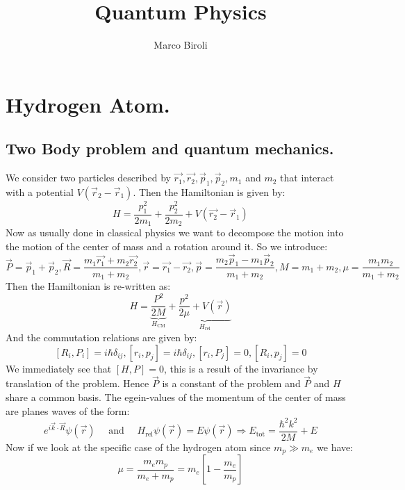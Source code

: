 \documentclass[10pt,a4paper]{book}
\author{Marco Biroli}
\title{Quantum Physics}
\begin{document}
\maketitle
\tableofcontents

\chapter{Hydrogen Atom.}
\section{Two Body problem and quantum mechanics.}
We consider two particles described by $\vec{r_1}, \vec{r_2}, \vec{p}_1, \vec{p}_2, m_1$ and $m_2$ that interact with a potential $V(\vec{r}_2 - \vec{r}_1)$. Then the Hamiltonian is given by:
\[
H = \frac{p_1^2}{2 m_1} + \frac{p_2^2}{2 m_2} + V(\vec{r_2} - \vec{r}_1)
\]
Now as usually done in classical physics we want to decompose the motion into the motion of the center of mass and a rotation around it. So we introduce:
\[
\vec{P} = \vec{p}_1 + \vec{p}_2,  \vec{R} = \frac{m_1 \vec{r_1} + m_2 \vec{r_2}}{m_1 + m_2}, \vec{r} = \vec{r_1} - \vec{r_2}, \vec{p} = \frac{m_2 \vec{p}_1 - m_1 \vec{p}_2}{m_1 + m_2}, M = m_1 + m_2, \mu = \frac{m_1 m_2}{m_1 + m_2}
\]
Then the Hamiltonian is re-written as:
\[
H = \underbrace{\frac{P^2}{2M}}_{H_{\text{CM}}} + \underbrace{\frac{p^2}{2\mu} + V(\vec{r})}_{H_\text{rel}}
\]
And the commutation relations are given by:
\[
[R_i, P_i] = i \hbar \delta_{ij}, [r_i, p_j] = i\hbar \delta_{ij}, [r_i, P_j] = 0, [R_i, p_j] = 0
\]
We immediately see that $[H, P] = 0$, this is a result of the invariance by translation of the problem. Hence $\vec{P}$ is a constant of the problem and $\vec{P}$ and $H$ share a common basis. The egein-values of the momentum of the center of mass are planes waves of the form:
\[
e^{i \vec{k} \cdot \vec{R}} \psi(\vec{r}) \quad \text{ and } \quad H_\text{rel} \psi(\vec{r}) = E \psi(\vec{r}) \Rightarrow E_\text{tot} = \frac{\hbar^2 k^2}{2 M} + E
\]
Now if we look at the specific case of the hydrogen atom since $m_p \gg m_e$ we have:
\[
\mu = \frac{m_e m_p}{m_e + m_p} = m_e \left[1 - \frac{m_e}{m_p}\right]
\]
\end{document}
